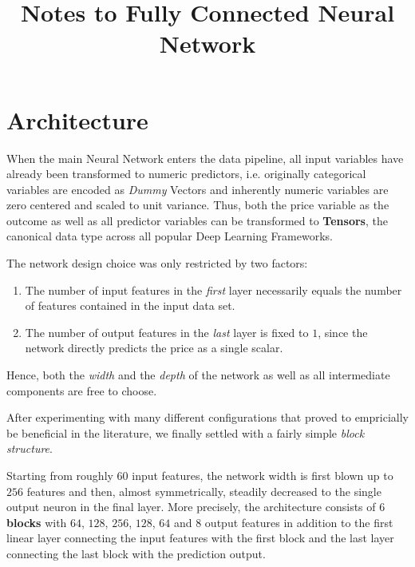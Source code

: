 \documentclass[12pt, letterpaper]{article}
\title{Notes to Fully Connected Neural Network}
\author{}
\date{}
\begin{document}
\maketitle
\tableofcontents
\setcounter{tocdepth}{3}

\section{Architecture}

When the main Neural Network enters the data pipeline, all input variables have already been transformed to numeric predictors, i.e. originally categorical variables are encoded as \textit{Dummy} Vectors and inherently numeric variables are zero centered and scaled to unit variance.
Thus, both the price variable as the outcome as well as all predictor variables can be transformed to \textbf{Tensors}, the canonical data type across all popular Deep Learning Frameworks.

The network design choice was only restricted by two factors:
\begin{enumerate}
    \item The number of input features in the \emph{first} layer necessarily equals the number of features contained in the input data set.
    \item The number of output features in the \emph{last} layer is fixed to $1$, since the network directly predicts the price as a single scalar.
\end{enumerate}
Hence, both the \emph{width} and the \emph{depth} of the network as well as all intermediate components are free to choose.

After experimenting with many different configurations that proved to empricially be beneficial in the literature, we finally settled with a fairly simple \emph{block structure}.

Starting from roughly $60$ input features, the network width is first blown up to $256$ features and then, almost symmetrically, steadily decreased to the single output neuron in the final layer.
More precisely, the architecture consists of $6$ \textbf{blocks} with $64$, $128$, $256$, $128$, $64$ and $8$ output features in addition to the first linear layer connecting the input features with the first block and the last layer connecting the last block with the prediction output.
\end{document}
